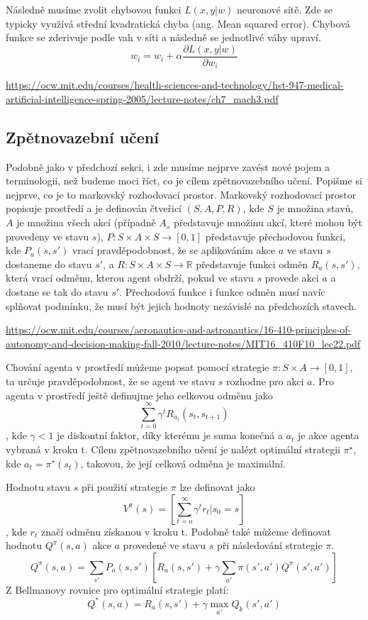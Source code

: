Následně musíme zvolit chybovou funkci $L(x,y|w)$ neuronové sítě. Zde se typicky využívá střední kvadratická chyba (ang. Mean squared error).
Chybová funkce se zderivuje podle vah v síti a následně se jednotlivé váhy upraví.
\newline
\[w_i = w_i + \alpha\frac{\partial L(x,y|w)}{\partial w_i}\]

\url{https://ocw.mit.edu/courses/health-sciences-and-technology/hst-947-medical-artificial-intelligence-spring-2005/lecture-notes/ch7_mach3.pdf}


\subsection{Zpětnovazební učení}
Podobně jako v předchozí sekci, i zde musíme nejprve zavést nové pojem a terminologii, než budeme moci říct, co je cílem zpětnovazebního učení.
Popišme si nejprve, co je to markovský rozhodovací prostor.
Markovský rozhodovací prostor popisuje prostředí a je definován čtveřicí $(S,A,P,R)$, kde $S$ je množina stavů, $A$ je množina všech akcí (případně $A_s$ představuje množinu akcí, které mohou být provedeny ve stavu $s$), 
$P: S \times A \times S \rightarrow [0,1]$ představuje přechodovou funkci, 
kde $P_a(s,s')$ vrací pravděpodobnost, že se aplikováním akce $a$ ve stavu $s$ dostaneme do stavu $s'$, 
a $R: S \times A \times S \rightarrow \mathbb{R}$ představuje funkci odměn $R_a(s,s')$, která vrací odměnu, kterou agent obdrží, pokud ve stavu $s$ provede akci $a$ a dostane se tak do stavu $s'$.
Přechodová funkce i funkce odměn musí navíc splňovat podmínku, že musí být jejich hodnoty nezávislé na předchozích stavech.

\url{https://ocw.mit.edu/courses/aeronautics-and-astronautics/16-410-principles-of-autonomy-and-decision-making-fall-2010/lecture-notes/MIT16_410F10_lec22.pdf}

Chování agenta v prostředí můžeme popsat pomocí strategie $\pi: S \times A \rightarrow [0,1]$, ta určuje pravděpodobnost, že se agent ve stavu $s$ rozhodne pro akci $a$.
Pro agenta v prostředí ještě definujme jeho celkovou odměnu jako \[\sum_{t=0}^{\infty} \gamma^tR_{a_t}(s_t,s_{t+1})\], kde $\gamma<1$ je diskontní faktor, díky kterému je suma konečná a $a_t$ je akce agenta vybraná v kroku t.
Cílem zpětnovazebního učení je nalézt optimální strategii $\pi^\star$, kde $a_t=\pi^\star(s_t)$, takovou, že její celková odměna je maximální.

Hodnotu stavu $s$ při použití strategie $\pi$ lze definovat jako 
\newline
\[V^{\pi}(s)=[\sum_{t=o}^{\infty} \gamma^tr_t|s_0=s]\], kde $r_t$ značí odměnu získanou v kroku t.
Podobně také můžeme definovat hodnotu $Q^{\pi}(s,a)$ akce $a$ provedené ve stavu $s$ při následování strategie $\pi$.
\[Q^\pi(s,a)=\sum_{s'}P_a(s,s')[R_a(s,s') + \gamma\sum_{a'} \pi(s',a')Q^\pi(s',a')]\]
Z Bellmanovy rovnice pro optimální strategie platí:
\[Q^*(s,a)=R_a(s,s') + \gamma\max_{a'}Q_k(s',a')\]

